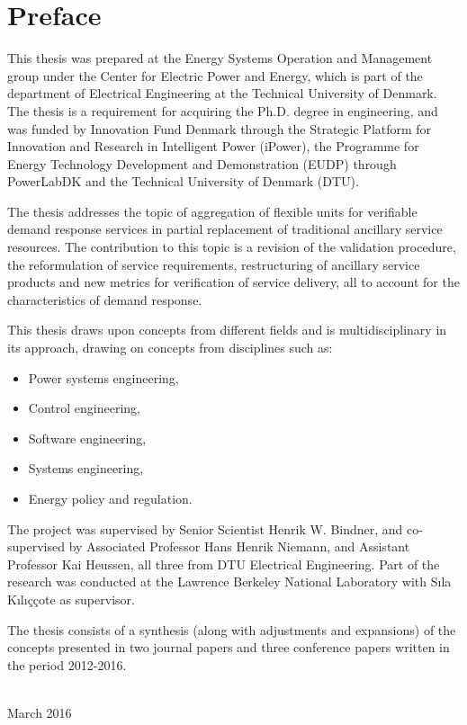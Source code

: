 \chapter{Preface}
This thesis was prepared at the Energy Systems Operation and Management group under the Center for Electric Power and Energy, which is part of the department of Electrical Engineering at the Technical University of Denmark. The thesis is a requirement for acquiring the Ph.D. degree in engineering, and was funded by Innovation Fund Denmark through the Strategic Platform for Innovation and Research in Intelligent Power (iPower), the Programme for Energy Technology Development and Demonstration (EUDP) through PowerLabDK and the Technical University of Denmark (DTU).

The thesis addresses the topic of aggregation of flexible units for verifiable demand response services in partial replacement of traditional ancillary service resources.
The contribution to this topic is a revision of the validation procedure, the reformulation of service requirements, restructuring of ancillary service products and new metrics for verification of service delivery, all to account for the characteristics of demand response.

This thesis draws upon concepts from different fields and is multidisciplinary in its approach, drawing on concepts from disciplines such as:
\begin{itemize}
	\item Power systems engineering,
	\item Control engineering,
	\item Software engineering,
	\item Systems engineering,
	\item Energy policy and regulation.
\end{itemize}

The project was supervised by Senior Scientist Henrik W. Bindner, and co-supervised by Associated Professor Hans Henrik Niemann, and Assistant Professor Kai Heussen, all three from DTU Electrical Engineering. Part of the research was conducted at the Lawrence Berkeley National Laboratory with S{\i}la K{\i}l{\i}\c{c}\c{c}ote as supervisor.

The thesis consists of a synthesis (along with adjustments and expansions) of the concepts presented in two journal papers and three conference papers written in the period 2012-2016.
\vfill

{
\centering
\begin{flushright}
    \thesisauthor{}\\
March 2016
\end{flushright}
}
